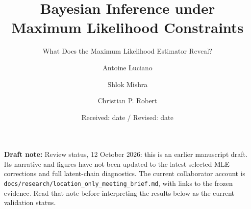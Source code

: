 \documentclass[smallextended,natbib,runningheads]{svjour3}
\newcommand{\draftnote}[1]{\textcolor{blue!70!black}{\textbf{Draft note:} #1}}
\begin{document}
\title{Bayesian Inference under Maximum Likelihood Constraints
}
\subtitle{What Does the Maximum Likelihood Estimator Reveal?}


\author{Antoine Luciano \and Shlok Mishra \and Christian P. Robert
}



\date{Received: date / Revised: date}


\maketitle

\draftnote{Review status, 12 October 2026: this is an earlier manuscript draft.
Its narrative and figures have not been updated to the latest selected-MLE
corrections and full latent-chain diagnostics. The current collaborator account
is \texttt{docs/research/location\_only\_meeting\_brief.md}, with links to the
frozen evidence. Read that note before interpreting the results below as the
current validation status.}
\end{document}
